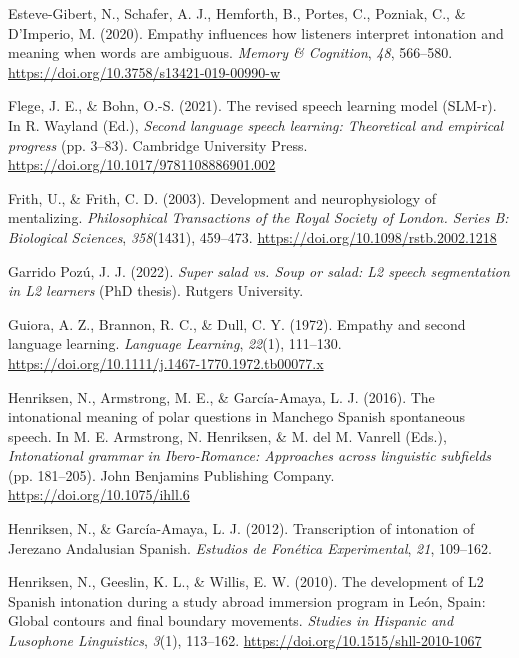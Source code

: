 \documentclass[]{article}
\newlength{\cslhangindent}
\newenvironment{CSLReferences}[2] %
 {%
  \setlength{\parindent}{0pt}
  \ifodd #1 \everypar{\setlength{\hangindent}{\cslhangindent}}\ignorespaces\fi
  \ifnum #2 > 0
  \setlength{\parskip}{#2\baselineskip}
  \fi
 }%
 {}
\begin{document}
\begin{CSLReferences}{1}{0}
\leavevmode{}%
Esteve-Gibert, N., Schafer, A. J., Hemforth, B., Portes, C., Pozniak, C., \& D'Imperio, M. (2020). Empathy influences how listeners interpret intonation and meaning when words are ambiguous. \emph{Memory \& Cognition}, \emph{48}, 566--580. \url{https://doi.org/10.3758/s13421-019-00990-w}

\leavevmode{}%
Flege, J. E., \& Bohn, O.-S. (2021). The revised speech learning model (SLM-r). In R. Wayland (Ed.), \emph{Second language speech learning: Theoretical and empirical progress} (pp. 3--83). Cambridge University Press. \url{https://doi.org/10.1017/9781108886901.002}

\leavevmode{}%
Frith, U., \& Frith, C. D. (2003). Development and neurophysiology of mentalizing. \emph{Philosophical Transactions of the Royal Society of London. Series B: Biological Sciences}, \emph{358}(1431), 459--473. \url{https://doi.org/10.1098/rstb.2002.1218}

\leavevmode{}%
Garrido Pozú, J. J. (2022). \emph{Super salad vs. Soup or salad: {L}2 speech segmentation in L2 learners} (PhD thesis). Rutgers University.

\leavevmode{}%
Guiora, A. Z., Brannon, R. C., \& Dull, C. Y. (1972). Empathy and second language learning. \emph{Language Learning}, \emph{22}(1), 111--130. \url{https://doi.org/10.1111/j.1467-1770.1972.tb00077.x}

\leavevmode{}%
Henriksen, N., Armstrong, M. E., \& García-Amaya, L. J. (2016). The intonational meaning of polar questions in {M}anchego {S}panish spontaneous speech. In M. E. Armstrong, N. Henriksen, \& M. del M. Vanrell (Eds.), \emph{Intonational grammar in {I}bero-{R}omance: {A}pproaches across linguistic subfields} (pp. 181--205). John Benjamins Publishing Company. \url{https://doi.org/10.1075/ihll.6}

\leavevmode{}%
Henriksen, N., \& García-Amaya, L. J. (2012). Transcription of intonation of {J}erezano {A}ndalusian {S}panish. \emph{Estudios de {F}onética {E}xperimental}, \emph{21}, 109--162.

\leavevmode{}%
Henriksen, N., Geeslin, K. L., \& Willis, E. W. (2010). The development of {L}2 {S}panish intonation during a study abroad immersion program in {L}e{ó}n, {S}pain: {G}lobal contours and final boundary movements. \emph{Studies in Hispanic and Lusophone Linguistics}, \emph{3}(1), 113--162. \url{https://doi.org/10.1515/shll-2010-1067}


\end{CSLReferences}
\end{document}
